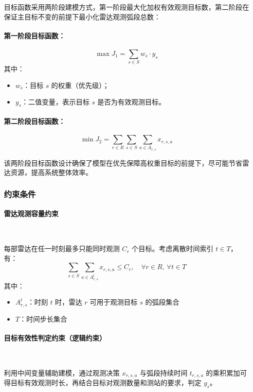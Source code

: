 \documentclass[openany,12pt,UTF8]{ctexart}
\begin{document}
目标函数采用两阶段建模方式，第一阶段最大化加权有效观测目标数，第二阶段在保证主目标不变的前提下最小化雷达观测弧段总数：

\paragraph{第一阶段目标函数：}
$$
    \max J_1 = \sum_{s \in S} w_s \cdot y_s
$$
其中：
\begin{itemize}
    \item $w_s$：目标 $s$ 的权重（优先级）；
    \item $y_s$：二值变量，表示目标 $s$ 是否为有效观测目标。
\end{itemize}

\paragraph{第二阶段目标函数：}
$$
    \min J_2 = \sum_{r \in R}\sum_{s \in S}\sum_{a \in A_{r,s}} x_{r,s,a}
$$

该两阶段目标函数设计确保了模型在优先保障高权重目标的前提下，尽可能节省雷达资源，提高系统整体效率。

\subsubsection{约束条件}

\paragraph{雷达观测容量约束}\

每部雷达在任一时刻最多只能同时观测 $C_r$ 个目标。考虑离散时间索引 $t \in T$，有：
$$
    \sum_{s \in S} \sum_{a \in A_{r,s}^t} x_{r,s,a} \leq C_r, \quad \forall r \in R,\ \forall t \in T
$$
其中：
\begin{itemize}
    \item $A_{r,s}^t$：时刻 $t$ 时，雷达 $r$ 可用于观测目标 $s$ 的弧段集合
    \item $T$：时间步长集合
\end{itemize}

\paragraph{目标有效性判定约束（逻辑约束）}\

利用中间变量辅助建模，通过观测决策 $x_{r,s,a}$ 与弧段持续时间 $t_{r,s,a}$ 的乘积累加可得目标有效观测时长，再结合目标对观测数量和测站的要求，判定 $y_s$。
\end{document}
